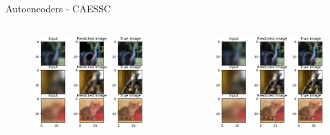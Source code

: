 \documentclass{beamer}
\begin{document}
\begin{frame}{Autoencoders - CAESSC\cite{CAESSC}}
{\begin{columns}
\begin{column}[c]{0.30\paperwidth}
\begin{figure}
                    \includegraphics[width=0.3\paperwidth,keepaspectratio]{caessc/test_CAESSC_d22_f128_half_no_sigmoid.pdf}
                    \caption{}                         
                \end{figure}
            \end{column}
            \begin{column}[c]{0.30\paperwidth}
                \begin{figure}
                    \centering
                    \includegraphics[width=0.3\paperwidth,keepaspectratio]{caessc/test_CAESSC_d22_f128_half.pdf}               

\end{figure}
\end{column}
\end{columns}}
\end{frame}
\end{document}
